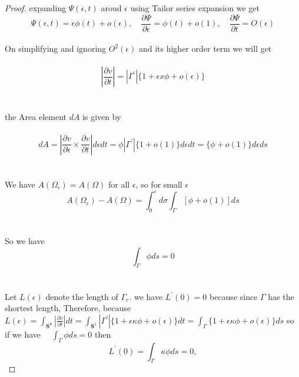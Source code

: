 \documentclass[oneside]{book}
\theoremstyle{definition}
\begin{document}
\begin{proof}
expanding $\Psi(\epsilon, t)$ aroud $\epsilon$ using Tailor series expansion we get \\

$$
\Psi(\epsilon, t)=\epsilon \phi(t)+o(\epsilon), \quad \frac{\partial \Psi}{\partial \epsilon}=\phi(t)+o(1), \quad \frac{\partial \Psi}{\partial t}=O(\epsilon)
$$ \\
On simplifying and ignoring $O^2(\epsilon)$ and its higher order term we will get \\\\
$$
\left|\frac{\partial v}{\partial t}\right|=\left|\Gamma^{\prime}\right|\{1+\epsilon x \phi+o(\epsilon)\}
$$ 
\\\\
 the Area element $d A$  is given by
 \\\\
     \begin{equation}
     \label{eq13}  
d A=\left|\frac{\partial v}{\partial \epsilon} \times \frac{\partial v}{\partial t}\right| d \epsilon d t=\phi\left|\Gamma^{\prime}\right|\{1+o(1)\} d \epsilon d t=\{\phi+o(1)\} d \epsilon d s
    \end{equation} \\\\
We have $A\left(\Omega_{\epsilon}\right)=A(\Omega)$ for all $\epsilon$, so for small $\epsilon$ \\

 $$
A\left(\Omega_{\epsilon}\right)-A(\Omega)=\int_{0}^{\epsilon} d \sigma \int_{\Gamma}[\phi+o(1)] d s
$$
\\\\
So we have \\
$$  
\int_{\Gamma} \phi d s=0
$$ \\\\
 Let $L(\epsilon)$ denote the length of $\Gamma_{e} .$  we have
$L^{\prime}(0)=0$ because since $\Gamma$ has the shortest length, Therefore, because
$L(\epsilon)=\int_{\mathbf{S^1}}\left|\frac{\partial v}{\partial t}\right| d t=\int_{\mathbf{S}^{1}}\left|\Gamma^{\prime}\right|\{1+\epsilon \kappa \phi+o(\epsilon)\} d t=\int_{\Gamma}\{1+\epsilon \kappa \phi+o(\epsilon)\} d s$
 so if we have
 $\quad \int_{\Gamma} \phi d s=0$ then 
$$
L^{\prime}(0)=\int_{\Gamma} \kappa \phi d s=0, 
$$

\end{proof} 
\end{document}
